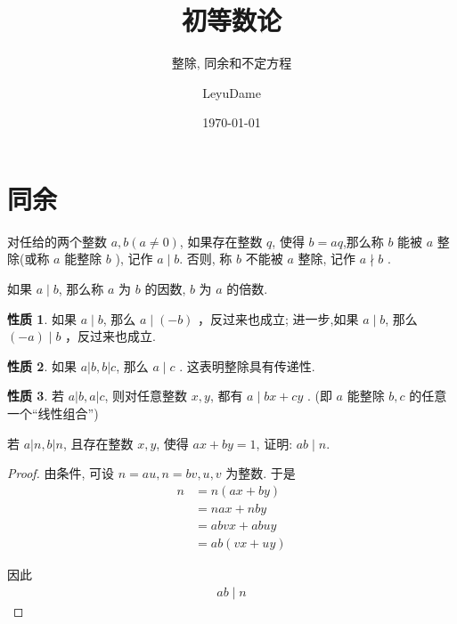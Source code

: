\documentclass[aspectratio=169]{ctexbeamer}
\title[初等数论]{初等数论}
\subtitle{整除, 同余和不定方程}
\author{LeyuDame}
\date[\today]{\today}
\theoremstyle{definition}
\newtheorem{property}{性质}[section]
\theoremstyle{plain}
\begin{document}
\frame{\titlepage}
\section{同余}
\begin{frame}
	\begin{definition}
		对任给的两个整数 $a ,  b(a \neq 0)$, 如果存在整数 $q$, 使得 $b=a q$,那么称 $b$ 能被 $a$ 整除(或称 $a$ 能整除 $b$ ), 记作 $a \mid b$. 否则, 称 $b$ 不能被 $a$ 整除, 记作 $a \nmid b$ .

		如果 $a \mid b$, 那么称 $a$ 为 $b$ 的因数, $b$ 为 $a$ 的倍数.
	\end{definition}
\end{frame}

\begin{frame}
	\begin{property}
		如果 $a \mid b$, 那么 $a \mid(-b)$ ，反过来也成立; 进一步,如果 $a \mid b$, 那么 $(-a) \mid b$ ，反过来也成立.
	\end{property}
	\begin{property}
		如果 $a|b, b| c$, 那么 $a \mid c$ . 这表明整除具有传递性.
	\end{property}

	\begin{property}
		若 $a|b, a| c$, 则对任意整数 $x ,  y$, 都有 $a \mid b x+c y$ . (即 $a$ 能整除 $b ,  c$ 的任意一个“线性组合”)
	\end{property}
\end{frame}

\begin{frame}
	\begin{example}
		若 $a|n, b| n$, 且存在整数 $x ,  y$, 使得 $a x+b y=1$, 证明: $a b \mid n$.
	\end{example}
\end{frame}

\begin{frame}
	\begin{proof}
		由条件, 可设 $n=a u, n=b v, u ,  v$ 为整数. 于是\\
		\begin{align}
			n & =n(a x+b y)      \\
			  & =n a x+n b y     \\
			  & =a b v x+a b u y \\
			  & =a b(v x+u y)
		\end{align}

		因此
		\begin{align*}
			a b \mid n
		\end{align*}
	\end{proof}
\end{frame}
\end{document}
